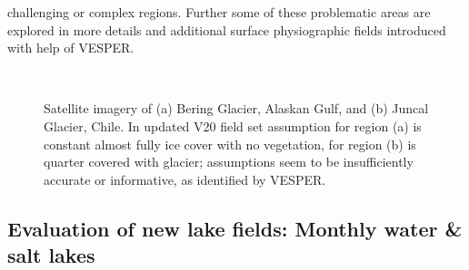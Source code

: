 \documentclass[hess, twostagejnl]{copernicus}
\begin{document}
challenging or complex regions. Further some of these problematic areas are explored in more details and additional surface physiographic fields introduced with help of VESPER.
	\begin{figure}[h!]
	 \\
	\caption{Satellite imagery of (a) Bering Glacier, Alaskan Gulf, and (b) Juncal Glacier, Chile. In updated V20 field set assumption for region (a) is constant almost fully ice cover with no vegetation, for region (b) is quarter covered with glacier; assumptions seem to be insufficiently accurate or informative, as identified by VESPER.
	} 
	\label{fig:glacier}
\end{figure}


\subsection{Evaluation of new lake fields: Monthly water \& salt lakes}
\end{document}
